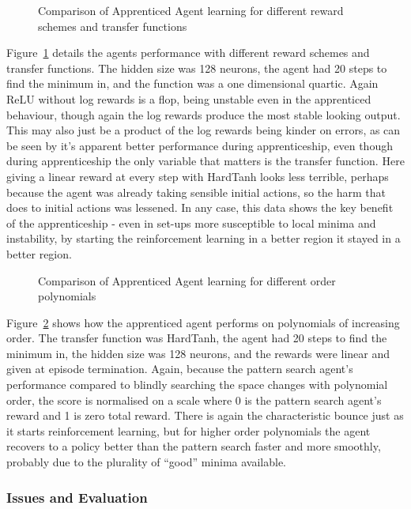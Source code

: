 \begin{figure}
\centering

\caption{Comparison of Apprenticed Agent learning for different reward schemes and transfer functions}
\label{fig:exp3app}
\end{figure}

Figure~\ref{fig:exp3app} details the agents performance with different reward schemes and transfer functions. The hidden size was 128 neurons, the agent had 20 steps to find the minimum in, and the function was a one dimensional quartic. Again ReLU without log rewards is a flop, being unstable even in the apprenticed behaviour, though again the log rewards produce the most stable looking output. This may also just be a product of the log rewards being kinder on errors, as can be seen by it's apparent better performance during apprenticeship, even though during apprenticeship the only variable that matters is the transfer function. Here giving a linear reward at every step with HardTanh looks less terrible, perhaps because the agent was already taking sensible initial actions, so the harm that does to initial actions was lessened. In any case, this data shows the key benefit of the apprenticeship - even in set-ups more susceptible to local minima and instability, by starting the reinforcement learning in a better region it stayed in a better region.

\begin{figure}
\centering

\caption{Comparison of Apprenticed Agent learning for different order polynomials}
\label{fig:exp2parapp}
\end{figure}

Figure~\ref{fig:exp2parapp} shows how the apprenticed agent performs on polynomials of increasing order. The transfer function was HardTanh, the agent had 20 steps to find the minimum in, the hidden size was 128 neurons, and the rewards were linear and given at episode termination. Again, because the pattern search agent's performance compared to blindly searching the space changes with polynomial order, the score is normalised on a scale where 0 is the pattern search agent's reward and 1 is zero total reward. There is again the characteristic bounce just as it starts reinforcement learning, but for higher order polynomials the agent recovers to a policy better than the pattern search faster and more smoothly, probably due to the plurality of ``good'' minima available.


\subsubsection{Issues and Evaluation}

